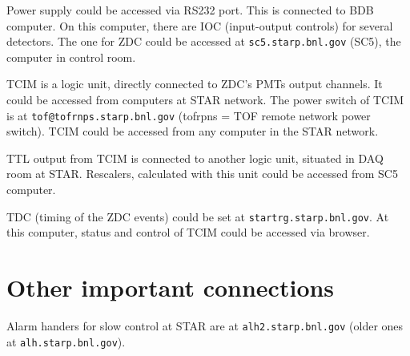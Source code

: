 Power supply could be accessed via RS232 port. This is connected to BDB computer. On this computer, there are IOC (input-output controls) for several detectors. The one for ZDC could be accessed at \texttt{sc5.starp.bnl.gov} (SC5), the computer in control room.

TCIM is a logic unit, directly connected to ZDC's PMTs output channels. It could be accessed from computers at STAR network.
The power switch of TCIM is at \texttt{tof@tofrnps.starp.bnl.gov} (tofrpns = TOF remote network power switch).
TCIM could be accessed from any computer in the STAR network.

TTL output from TCIM is connected to another logic unit, situated in DAQ room at STAR. Rescalers, calculated with this unit could be accessed from SC5 computer.

TDC (timing of the ZDC events) could be set at \texttt{startrg.starp.bnl.gov}. At this computer, status and control of TCIM could be accessed via browser.

\section{Other important connections}
Alarm handers for slow control at STAR are at \texttt{alh2.starp.bnl.gov} (older ones at \texttt{alh.starp.bnl.gov}).